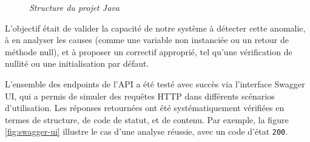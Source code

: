 \documentclass[12pt,a4paper]{report}
\begin{document}
	\begin{figure}[H]
		\centering
		\caption{\textit{Structure du projet Java}}
		\label{fig:premier-test}
	\end{figure}
	
	L'objectif était de valider la capacité de notre système à détecter cette anomalie, à en analyser les causes (comme une variable non instanciée ou un retour de méthode null), et à proposer un correctif approprié, tel qu'une vérification de nullité ou une initialisation par défaut.
	
	L'ensemble des endpoints de l'API a été testé avec succès via l'interface Swagger UI, qui a permis de simuler des requêtes HTTP dans différents scénarios d'utilisation. Les réponses retournées ont été systématiquement vérifiées en termes de structure, de code de statut, et de contenu. Par exemple, la figure \ref{fig:swagger-ui} illustre le cas d'une analyse réussie, avec un code d'état \verb|200|.
	
\end{document}
